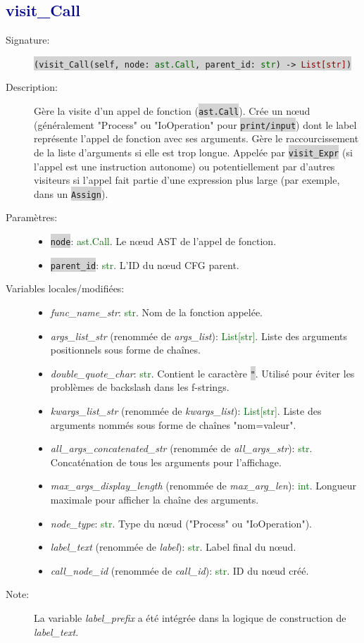 \documentclass[11pt,a4paper]{article}
\newcommand{\code}[1]{\colorbox{lightgray}{\texttt{\small #1}}}
\newcommand{\var}[1]{\textit{#1}}
\newcommand{\vartype}[1]{\textcolor{darkgreen}{#1}}
\newcommand{\methodname}[1]{\textbf{\textcolor{darkblue}{#1}}}
\newcommand{\param}[1]{\code{#1}}
\newcommand{\rettype}[1]{\textcolor{darkred}{#1}}
\begin{document}
\subsection*{\methodname{visit\_Call}}
\begin{description}
    \item[Signature:] \code{(visit\_Call(self, node: \vartype{ast.Call}, parent\_id: \vartype{str}) -> \rettype{List[str]})}
    \item[Description:] Gère la visite d'un appel de fonction (\code{ast.Call}). Crée un nœud (généralement "Process" ou "IoOperation" pour \code{print/input}) dont le label représente l'appel de fonction avec ses arguments. Gère le raccourcissement de la liste d'arguments si elle est trop longue. Appelée par \code{visit\_Expr} (si l'appel est une instruction autonome) ou potentiellement par d'autres visiteurs si l'appel fait partie d'une expression plus large (par exemple, dans un \code{Assign}).
    \item[Paramètres:]
    \begin{itemize}
        \item \param{node}: \vartype{ast.Call}. Le nœud AST de l'appel de fonction.
        \item \param{parent\_id}: \vartype{str}. L'ID du nœud CFG parent.
    \end{itemize}
    \item[Variables locales/modifiées:]
    \begin{itemize}
        \item \var{func\_name\_str}: \vartype{str}. Nom de la fonction appelée.
        \item \var{args\_list\_str} (renommée de \var{args\_list}): \vartype{List[str]}. Liste des arguments positionnels sous forme de chaînes.
        \item \var{double\_quote\_char}: \vartype{str}. Contient le caractère \code{"}. Utilisé pour éviter les problèmes de backslash dans les f-strings.
        \item \var{kwargs\_list\_str} (renommée de \var{kwargs\_list}): \vartype{List[str]}. Liste des arguments nommés sous forme de chaînes "nom=valeur".
        \item \var{all\_args\_concatenated\_str} (renommée de \var{all\_args\_str}): \vartype{str}. Concaténation de tous les arguments pour l'affichage.
        \item \var{max\_args\_display\_length} (renommée de \var{max\_arg\_len}): \vartype{int}. Longueur maximale pour afficher la chaîne des arguments.
        \item \var{node\_type}: \vartype{str}. Type du nœud ("Process" ou "IoOperation").
        \item \var{label\_text} (renommée de \var{label}): \vartype{str}. Label final du nœud.
        \item \var{call\_node\_id} (renommée de \var{call\_id}): \vartype{str}. ID du nœud créé.
    \end{itemize}
    \item[Note:] La variable \var{label\_prefix} a été intégrée dans la logique de construction de \var{label\_text}.
\end{description}
\end{document}
